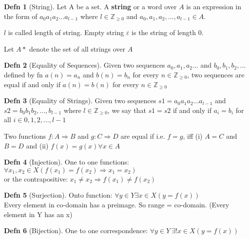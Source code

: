 \documentclass[a4paper]{article}
\theoremstyle{definition}
\newtheorem*{defn}{Defn}
\newenvironment{theorem}[1]
  {\renewcommand\theinnertheorem{#1}\innertheorem}
  {\endinnertheorem}
\begin{document}
\begin{defn}[String] Let A be a set. A \textbf{string} or a word over $A$ is an expression in the form of $a_0a_1a_2...a_{l-1}$ where $l \in \mathbb{Z}_{\geq 0}$ and $a_0,a_1,a_2,...,a_{l-1} \in A$. 

  $l$ is called length of string. Empty string $\varepsilon$ is the string of length 0. 

  Let $A*$ denote the set of all strings over $A$
\end{defn}

\begin{defn}[Equality of Sequences] Given two sequences $a_0,a_1,a_2...$ and $b_0,b_1,b_2,...$ defined by fn $a(n) = a_n$ and $b(n) = b_n$ for every $n \in \mathbb{Z}_{\geq0}$, two sequences are equal if and only if $a(n) = b(n)$ for every $n \in \mathbb{Z}_{\geq0}$
\end{defn}

\begin{defn}[Equality of Strings] Given two sequences $s1=a_0a_1a_2...a_{l-1}$ and $s2 = b_0 b_1 b_2, ...,b_{l-1}$ where $l \in \mathbb{Z}_{\geq0}$, we say that $s1 = s2$ if and only if $a_i = b_i$ for all $i \in {0,1,2,...,l-1}$
\end{defn}

\begin{theorem}{7.1.1 Function Equality} 

  Two functions $f: A \Rightarrow B$ and $g: C \Rightarrow D$ are equal if i.e. $f = g$, iff (i) $A = C$ and $B = D$ and (ii) $f(x) = g(x) \forall x \in A$
\end{theorem}

\begin{defn}[Injection] One to one functions: 
  $\forall x_1, x_2 \in X (f(x_1) = f(x_2) \Rightarrow x_1 = x_2)$\\
  or the contrapositive: $x_1 \not = x_2 \Rightarrow f(x_1) \not = f(x_2)$

\end{defn}
\begin{defn}[Surjection] Onto function: 
  $\forall y \in Y \exists x \in X (y = f(x))$\\
  Every element in co-domain has a preimage. So range = co-domain. (Every element in Y has an x)

\end{defn}

\begin{defn}[Bijection] One to one correspondence: 
  $\forall y \in Y\ \exists! x \in X(y = f(x))$
\end{defn}
\end{document}
